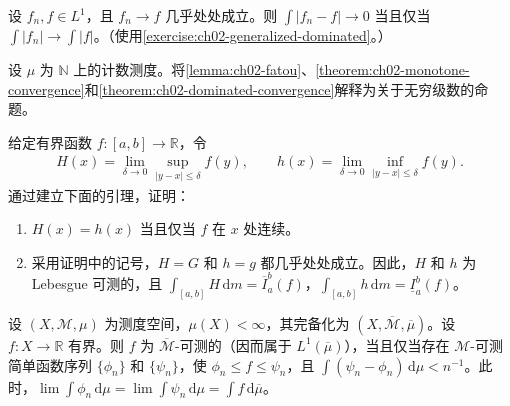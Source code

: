 \documentclass[../../main.tex]{subfiles}%
\begin{document}
\begin{exercise}\label{exercise:ch02-scheffe}
设 $f_n,f\in L^1$，且 $f_n\to f$ 几乎处处成立。则 $\int|f_n-f|\to0$ 当且仅当 $\int|f_n|\to\int|f|$。（使用\cref{exercise:ch02-generalized-dominated}。）
\end{exercise}
\begin{exercise}\label{exercise:ch02-counting-convergence}
设 $\mu$ 为 $\mathbb{N}$ 上的计数测度。将\cref{lemma:ch02-fatou}、\cref{theorem:ch02-monotone-convergence}和\cref{theorem:ch02-dominated-convergence}解释为关于无穷级数的命题。
\end{exercise}
\begin{exercise}\label{exercise:ch02-riemann-discontinuities}
给定有界函数 $f:[a,b]\to\mathbb{R}$，令
\begin{align*}
H(x)=\lim_{\delta\to0}\sup_{|y-x|\le\delta}f(y),\qquad
h(x)=\lim_{\delta\to0}\inf_{|y-x|\le\delta}f(y).
\end{align*}
通过建立下面的引理，证明：
\begin{enumerate}
\item\label{item:ch02-oscillation-continuity} $H(x)=h(x)$ 当且仅当 $f$ 在 $x$ 处连续。
\item\label{item:ch02-envelope-integrals} 采用证明中的记号，$H=G$ 和 $h=g$ 都几乎处处成立。因此，$H$ 和 $h$ 为 Lebesgue 可测的，且 $\int_{[a,b]}H\,\mathrm{d}m=\overline{I}_a^b(f)$，$\int_{[a,b]}h\,\mathrm{d}m=\underline{I}_a^b(f)$。
\end{enumerate}
\end{exercise}
\begin{exercise}\label{exercise:ch02-upper-lower-simple}
设 $(X,\mathscr{M},\mu)$ 为测度空间，$\mu(X)<\infty$，其完备化为 $(X,\overline{\mathscr{M}},\overline{\mu})$。设 $f:X\to\mathbb{R}$ 有界。则 $f$ 为 $\overline{\mathscr{M}}$-可测的（因而属于 $L^1(\overline{\mu})$），当且仅当存在 $\mathscr{M}$-可测简单函数序列 $\{\phi_n\}$ 和 $\{\psi_n\}$，使 $\phi_n\le f\le\psi_n$，且 $\int(\psi_n-\phi_n)\,\mathrm{d}\mu<n^{-1}$。此时，$\lim\int\phi_n\,\mathrm{d}\mu=\lim\int\psi_n\,\mathrm{d}\mu=\int f\,\mathrm{d}\overline{\mu}$。
\end{exercise}
\end{document}
